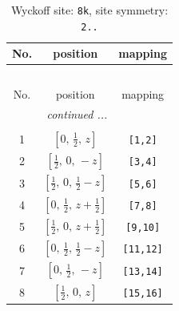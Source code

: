 \documentclass[fleqn,8pt]{jsarticle}
\begin{document}
\renewcommand{\arraystretch}{1.2}
\begin{longtable}{ccc}
\caption{Wyckoff site: {\tt 8k}, site symmetry: {\tt 2..}}
 \\
 \hline \hline
No. & position & mapping \\ \hline \endfirsthead

\multicolumn{2}{l}{\tablename\ \thetable{}} \\
 \hline \hline
No. & position & mapping \\ \hline \endhead

 \hline \hline
\multicolumn{2}{r}{\footnotesize\it continued ...} \\ \endfoot

 \hline \hline
\multicolumn{2}{r}{} \\ \endlastfoot

1 & $\left[ 0,\, \frac{1}{2},\, z \right]$ & {\tt [1,2]} \\ \hline
2 & $\left[ \frac{1}{2},\, 0,\, - z \right]$ & {\tt [3,4]} \\ \hline
3 & $\left[ \frac{1}{2},\, 0,\, \frac{1}{2} - z \right]$ & {\tt [5,6]} \\ \hline
4 & $\left[ 0,\, \frac{1}{2},\, z + \frac{1}{2} \right]$ & {\tt [7,8]} \\ \hline
5 & $\left[ \frac{1}{2},\, 0,\, z + \frac{1}{2} \right]$ & {\tt [9,10]} \\ \hline
6 & $\left[ 0,\, \frac{1}{2},\, \frac{1}{2} - z \right]$ & {\tt [11,12]} \\ \hline
7 & $\left[ 0,\, \frac{1}{2},\, - z \right]$ & {\tt [13,14]} \\ \hline
8 & $\left[ \frac{1}{2},\, 0,\, z \right]$ & {\tt [15,16]} \\
\end{longtable}
\renewcommand{\arraystretch}{1.2}
\end{document}
